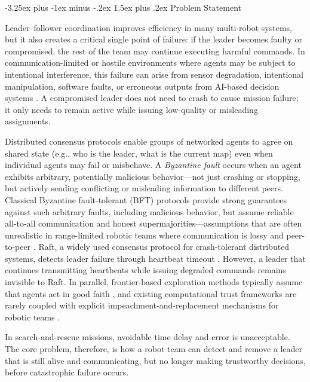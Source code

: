\documentclass[conference]{IEEEtran}
\makeatletter
\renewcommand{\subsection}{\@startsection{subsection}{2}{\z@}%
  {-3.25ex plus -1ex minus -.2ex}%
  {1.5ex plus .2ex}%
  {\normalfont\normalsize\itshape\centering}}
\makeatother
\begin{document}
\subsection{Problem Statement}

Leader--follower coordination improves efficiency in many multi-robot systems, but it also creates a critical single point of failure: if the leader becomes faulty or compromised, the rest of the team may continue executing harmful commands. In communication-limited or hostile environments where agents may be subject to intentional interference, this failure can arise from sensor degradation, intentional manipulation, software faults, or erroneous outputs from AI-based decision systems \cite{douceur2002sybil, ji2023hallucination}. A compromised leader does not need to crash to cause mission failure; it only needs to remain active while issuing low-quality or misleading assignments.


Distributed consensus protocols enable groups of networked agents to agree on shared state (e.g., who is the leader, what is the current map) even when individual agents may fail or misbehave. A \emph{Byzantine fault} occurs when an agent exhibits arbitrary, potentially malicious behavior---not just crashing or stopping, but actively sending conflicting or misleading information to different peers. Classical Byzantine fault-tolerant (BFT) protocols provide strong guarantees against such arbitrary faults, including malicious behavior, but assume reliable all-to-all communication and honest supermajorities---assumptions that are often unrealistic in range-limited robotic teams where communication is lossy and peer-to-peer \cite{lamport1982byzantine, castro1999practical}. Raft, a widely used consensus protocol for crash-tolerant distributed systems, detects leader failure through heartbeat timeout \cite{ongaro2014raft}. However, a leader that continues transmitting heartbeats while issuing degraded commands remains invisible to Raft. In parallel, frontier-based exploration methods typically assume that agents act in good faith \cite{yamauchi1997frontier, burgard2000collaborative}, and existing computational trust frameworks are rarely coupled with explicit impeachment-and-replacement mechanisms for robotic teams \cite{marsh1994formalising}.

In search-and-rescue missions, avoidable time delay and error is unacceptable. The core problem, therefore, is how a robot team can detect and remove a leader that is still alive and communicating, but no longer making trustworthy decisions, before catastrophic failure occurs.
\end{document}
